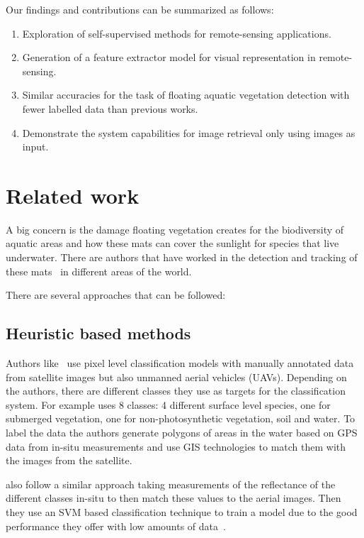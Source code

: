 \documentclass[conference]{IEEEtran}
\begin{document}
    Our findings and contributions can be summarized as follows:
    \begin{enumerate}
        \item Exploration of self-supervised methods for remote-sensing applications.
        \item Generation of a feature extractor model for visual representation in remote-sensing.
        \item Similar accuracies for the task of floating aquatic vegetation detection with fewer labelled data than previous works.
        \item Demonstrate the system capabilities for image retrieval only using images as input.
    \end{enumerate}


    \section{Related work}
    A big concern is the damage floating vegetation creates for the biodiversity of aquatic areas and how these mats can cover the sunlight for species that live underwater.
    There are authors that have worked in the detection and tracking of these mats~\cite{donyana1, donyana2,rs14133013, srilanka_veg, 10.3389/fmars.2022.1004012} in different areas of the world.

    There are several approaches that can be followed:
    \subsection*{Heuristic based methods}

    Authors like~\citet{srilanka_veg, 10.3389/fmars.2022.1004012} use pixel level classification models with manually annotated data from satellite images but also unmanned aerial vehicles (UAVs).
    Depending on the authors, there are different classes they use as targets for the classification system.
    For example \citet{rs14133013} uses 8 classes: 4 different surface level species, one for submerged vegetation, one for non-photosynthetic vegetation, soil and water.
    To label the data the authors generate polygons of areas in the water based on GPS data from in-situ measurements and use GIS technologies to match them with the images from the satellite.

    \citet{10.3389/fmars.2022.1004012} also follow a similar approach taking measurements of the reflectance of the different classes in-situ to then match these values to the aerial images.
    Then they use an SVM based classification technique to train a model due to the good performance they offer with low amounts of data~\cite{Cortes1995}.
\end{document}
